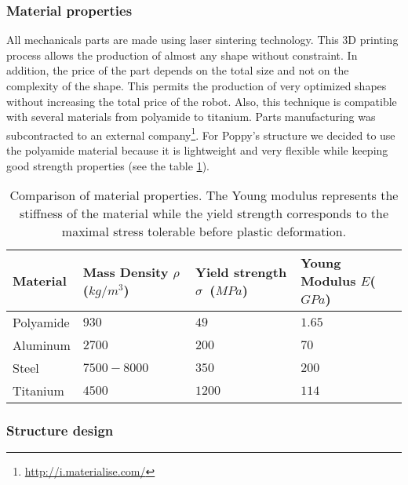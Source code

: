 
\subsubsection{Material properties} %
\label{ssub:material_properties}

All mechanicals parts are made using laser sintering technology. This 3D printing process allows the production of almost any shape without constraint. In addition, the price of the part depends on the total size and not on the complexity of the shape. This permits the production of very optimized shapes without increasing the total price of the robot. Also, this technique is compatible with several materials from polyamide to titanium. Parts manufacturing was subcontracted to an external company\footnote{\url{http://i.materialise.com/}}.
For Poppy's structure we decided to use the polyamide material because it is lightweight and very flexible while keeping good strength properties (see the table \ref{tab:materials}).

\begin{table}[h]
    \centering
    \begin{tabularx}{0.8\linewidth }{l X X X}
        Material & Mass Density $\rho$ ($kg/m^3$) &  Yield strength $\sigma$~($MPa$) & Young Modulus $E$($GPa$)\\
        \hline
        Polyamide & $930$ & $49$ & $1.65$\\

        Aluminum & $2700$ & $200$ & $70$\\

        Steel & $7500-8000$ & $350$ & $200$\\

        Titanium & $4500$ & $1200$ & $114$\\

    \end{tabularx}

    \caption{Comparison of material properties.
    The Young modulus represents the stiffness of the material while the yield strength corresponds to the maximal stress tolerable before plastic deformation.}
    \label{tab:materials}
\end{table}




\subsubsection{Structure design} %
\label{ssub:structure_design}


